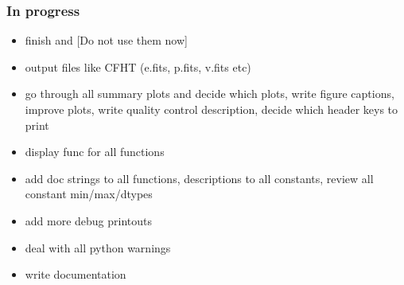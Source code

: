 \documentclass[a4paper,10pt,english]{report}
\begin{document}
\subsubsection{In progress}
\label{\detokenize{user/general/todo:in-progress}}\begin{itemize}
\item {} 
finish  and  {[}Do not use them now{]}

\item {} 
output files like CFHT (e.fits, p.fits, v.fits etc)

\item {} 
go through all summary plots and decide which plots, write figure captions,
improve plots, write quality control description, decide which header keys to print

\item {} 
display func for all functions

\item {} 
add doc strings to all functions, descriptions to all constants, review all
constant min/max/dtypes

\item {} 
add more debug printouts

\item {} 
deal with all python warnings

\item {} 
write documentation

\end{itemize}
\end{document}
